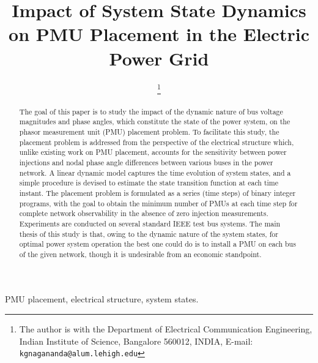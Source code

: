 \documentclass[10pt,journal,twocolumn]{IEEEtran}\IEEEoverridecommandlockouts
\begin{document}
\title{Impact of System State Dynamics on PMU Placement in the Electric Power Grid}
\author{\thanks{The author is with the Department of Electrical Communication Engineering, Indian Institute of Science, Bangalore 560012, INDIA, E-mail: \texttt{kgnagananda@alum.lehigh.edu}}
}

\date{}
\maketitle

\begin{abstract}
The goal of this paper is to study the impact of the dynamic nature of bus voltage magnitudes and phase angles, which constitute the state of the power system, on the phasor measurement unit (PMU) placement problem. To facilitate this study, the placement problem is addressed from the perspective of the electrical structure which, unlike existing work on PMU placement, accounts for the sensitivity between power injections and nodal phase angle differences between various buses in the power network. A linear dynamic model captures the time evolution of system states, and a simple procedure is devised to estimate the state transition function at each time instant. The placement problem is formulated as a series (time steps) of binary integer programs, with the goal to obtain the minimum number of PMUs at each time step for complete network observability in the absence of zero injection measurements. Experiments are conducted on several standard IEEE test bus systems. The main thesis of this study is that, owing to the dynamic nature of the system states, for optimal power system operation the best one could do is to install a PMU on each bus of the given network, though it is undesirable from an economic standpoint.
\end{abstract}

\begin{IEEEkeywords}
 PMU placement, electrical structure, system states.
\end{IEEEkeywords}
\end{document}
